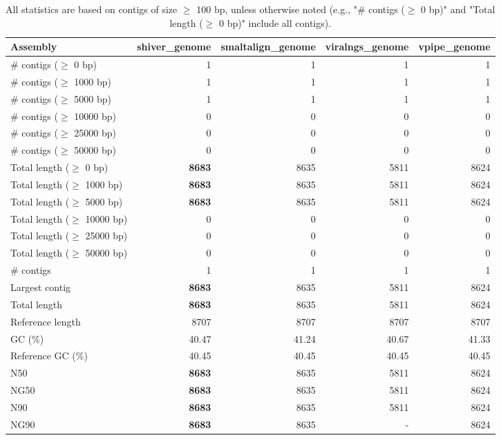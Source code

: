 \documentclass[12pt,a4paper]{article}
\begin{document}
\begin{table}[ht]
\begin{center}
\caption{All statistics are based on contigs of size $\geq$ 100 bp, unless otherwise noted (e.g., "\# contigs ($\geq$ 0 bp)" and "Total length ($\geq$ 0 bp)" include all contigs).}
\begin{tabular}{|l*{4}{|r}|}
\hline
Assembly & shiver\_genome & smaltalign\_genome & viralngs\_genome & vpipe\_genome \\ \hline
\# contigs ($\geq$ 0 bp) & 1 & 1 & 1 & 1 \\ \hline
\# contigs ($\geq$ 1000 bp) & 1 & 1 & 1 & 1 \\ \hline
\# contigs ($\geq$ 5000 bp) & 1 & 1 & 1 & 1 \\ \hline
\# contigs ($\geq$ 10000 bp) & 0 & 0 & 0 & 0 \\ \hline
\# contigs ($\geq$ 25000 bp) & 0 & 0 & 0 & 0 \\ \hline
\# contigs ($\geq$ 50000 bp) & 0 & 0 & 0 & 0 \\ \hline
Total length ($\geq$ 0 bp) & {\bf 8683} & 8635 & 5811 & 8624 \\ \hline
Total length ($\geq$ 1000 bp) & {\bf 8683} & 8635 & 5811 & 8624 \\ \hline
Total length ($\geq$ 5000 bp) & {\bf 8683} & 8635 & 5811 & 8624 \\ \hline
Total length ($\geq$ 10000 bp) & 0 & 0 & 0 & 0 \\ \hline
Total length ($\geq$ 25000 bp) & 0 & 0 & 0 & 0 \\ \hline
Total length ($\geq$ 50000 bp) & 0 & 0 & 0 & 0 \\ \hline
\# contigs & 1 & 1 & 1 & 1 \\ \hline
Largest contig & {\bf 8683} & 8635 & 5811 & 8624 \\ \hline
Total length & {\bf 8683} & 8635 & 5811 & 8624 \\ \hline
Reference length & 8707 & 8707 & 8707 & 8707 \\ \hline
GC (\%) & 40.47 & 41.24 & 40.67 & 41.33 \\ \hline
Reference GC (\%) & 40.45 & 40.45 & 40.45 & 40.45 \\ \hline
N50 & {\bf 8683} & 8635 & 5811 & 8624 \\ \hline
NG50 & {\bf 8683} & 8635 & 5811 & 8624 \\ \hline
N90 & {\bf 8683} & 8635 & 5811 & 8624 \\ \hline
NG90 & {\bf 8683} & 8635 & - & 8624 \\ \hline

\end{tabular}
\end{center}
\end{table}
\end{document}
